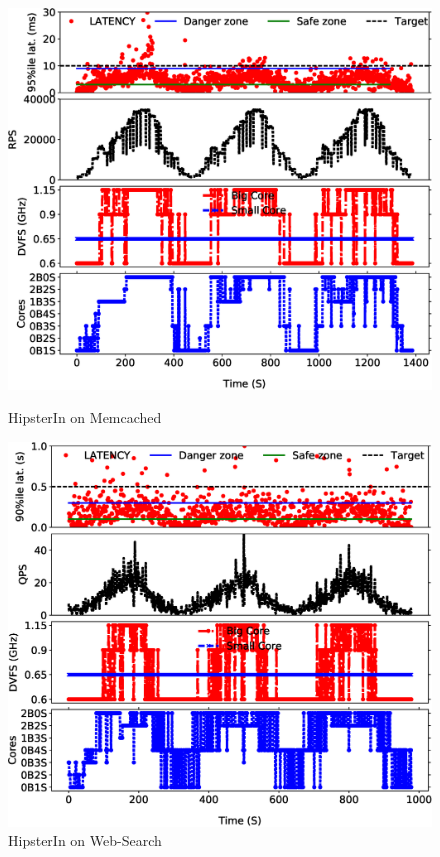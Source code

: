 \begin{figure}[b!]
\begin{minipage}[b]{.48\textwidth}
	\centering
	\includegraphics[width=\linewidth]{Chapter4/Figs/hipster-memcached-copy.eps}
    \caption[HipterIn on Memcached]{HipsterIn on Memcached}
	\label{fig: hipster-memcached} 
\end{minipage}
\hfill
\begin{minipage}[b]{.48\textwidth}
	\centering
	\includegraphics[width=\linewidth]{Chapter4/Figs/ril-elasticsearch.eps}
    \caption[HipsterIn on Web-Search]{HipsterIn on Web-Search}
	\label{fig: hipster-elasticsearch}
\end{minipage}
\end{figure}


